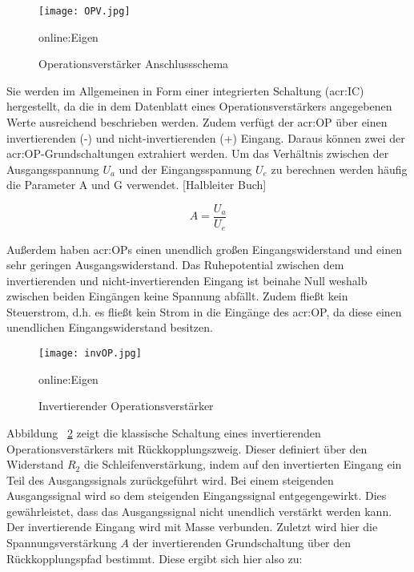 \begin{figure}[H]
	\centering
	\texttt{[image: OPV.jpg]}
	\caption[Operationsverstärker Anschlussschema]{Operationsverstärker Anschlussschema} 
	\gls{online:Eigen}
	\label{fig:OPV}
\end{figure}

Sie werden im Allgemeinen in Form einer integrierten Schaltung (\gls{acr:IC}) hergestellt, da die in dem Datenblatt eines Operationsverstärkers angegebenen Werte ausreichend beschrieben werden. Zudem verfügt der \gls{acr:OP} über einen invertierenden (-) und nicht-invertierenden (+) Eingang. Daraus können zwei der \gls{acr:OP}-Grundschaltungen extrahiert werden. Um das Verhältnis zwischen der Ausgangsspannung $U_{a}$ und der Eingangsspannung $U_{e}$ zu berechnen werden häufig die Parameter A und G verwendet. [Halbleiter Buch]

\begin{equation}
	\label{equ:bsp1}
	A = \frac{U_{a}}{U_{e}}
\end{equation}

Außerdem haben \gls{acr:OP}s einen unendlich großen Eingangswiderstand und einen sehr geringen Ausgangswiderstand.
Das Ruhepotential zwischen dem invertierenden und nicht-invertierenden Eingang ist beinahe Null weshalb zwischen beiden Eingängen keine Spannung abfällt. Zudem fließt kein Steuerstrom, d.h. es fließt kein Strom in die Eingänge des \gls{acr:OP}, da diese einen unendlichen Eingangswiderstand besitzen.\cite{federauOperationsverstaerker2017}
\begin{figure}[H]
	\centering
	\texttt{[image: invOP.jpg]}
	\caption[Invertierender Operationsverstärker]{Invertierender Operationsverstärker} 
	\gls{online:Eigen}
	\label{fig:ninvOP}
\end{figure}

Abbildung ~\ref{fig:ninvOP} zeigt die klassische Schaltung eines invertierenden Operationsverstärkers mit
Rückkopplungszweig. Dieser definiert über den Widerstand $R_{2}$ die Schleifenverstärkung, indem auf den invertierten Eingang ein Teil des Ausgangssignals zurückgeführt wird.  Bei einem steigenden Ausgangssignal wird so dem steigenden Eingangssignal entgegengewirkt. Dies gewährleistet, dass das Ausgangssignal nicht unendlich verstärkt werden kann. Der invertierende Eingang wird mit Masse verbunden. Zuletzt wird hier die Spannungsverstärkung $A$ der invertierenden Grundschaltung über den Rückkopplungspfad bestimmt. Diese ergibt sich hier also zu: 


